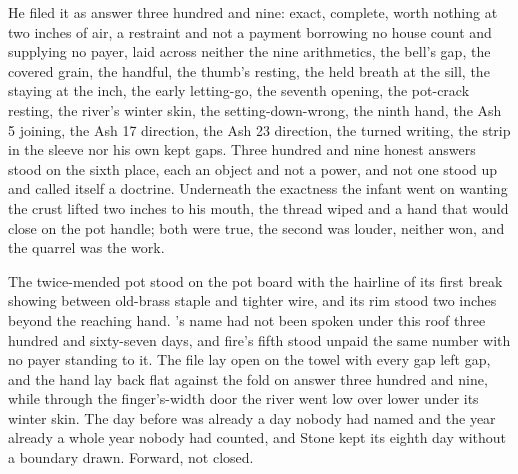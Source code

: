 He filed it as answer three hundred and nine: exact, complete, worth nothing at two inches of air, a restraint and not a payment borrowing no house count and supplying no payer, laid across neither the nine arithmetics, the bell's gap, the covered grain, the handful, the thumb's resting, the held breath at the sill, the staying at the inch, the early letting-go, the seventh opening, the pot-crack resting, the river's winter skin, the setting-down-wrong, the ninth hand, the Ash 5 joining, the Ash 17 direction, the Ash 23 direction, the turned writing, the strip in the sleeve nor his own kept gaps. Three hundred and nine honest answers stood on the sixth place, each an object and not a power, and not one stood up and called itself a doctrine. Underneath the exactness the infant went on wanting the crust lifted two inches to his mouth, the thread wiped and a hand that would close on the pot handle; both were true, the second was louder, neither won, and the quarrel was the work.

The twice-mended pot stood on the pot board with the hairline of its first break showing between old-brass staple and tighter wire, and its rim stood two inches beyond the reaching hand. 's name had not been spoken under this roof three hundred and sixty-seven days, and fire's fifth stood unpaid the same number with no payer standing to it. The file lay open on the towel with every gap left gap, and the hand lay back flat against the fold on answer three hundred and nine, while through the finger's-width door the river went low over lower under its winter skin. The day before was already a day nobody had named and the year already a whole year nobody had counted, and Stone kept its eighth day without a boundary drawn. Forward, not closed.
